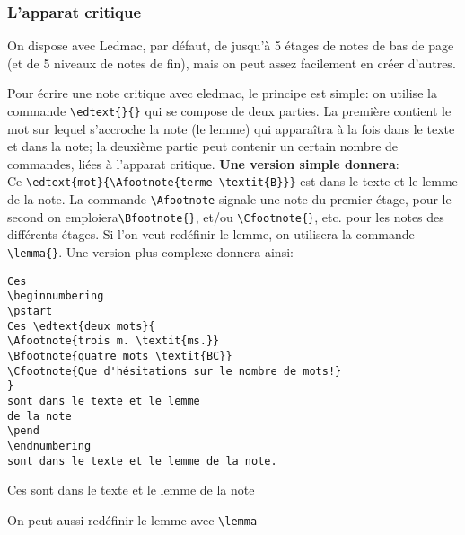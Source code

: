 \documentclass[a4paper,twoside,french,12pt]{book}
\begin{document}
 \endnumbering



\subsubsection{L'apparat critique}
On dispose avec Ledmac, par défaut, de jusqu'à 5 étages de notes de bas de page (et de 5 niveaux de notes de fin), mais on peut assez facilement en créer d'autres.

Pour écrire une note critique avec eledmac, le principe est simple: on utilise la commande \verb=\edtext{}{}= qui se compose de deux parties. La première contient le mot sur lequel s'accroche la note (le lemme) qui apparaîtra à la fois dans le texte et dans la note; la deuxième partie peut contenir un certain nombre de commandes, liées à l'apparat critique. \textbf{Une version simple donnera}:\\
Ce \verb=\edtext{mot}{\Afootnote{terme \textit{B}}}= est dans le texte et le lemme de la note.
\bigskip
La commande \verb=\Afootnote= signale une note du premier étage, pour le second on emploiera\verb=\Bfootnote{}=, et/ou \verb=\Cfootnote{}=, etc. pour les notes des différents étages. Si l'on veut redéfinir le lemme, on utilisera la commande \verb=\lemma{}=. Une version plus complexe donnera ainsi:\\
\begin{verbatim}
Ces
\beginnumbering
\pstart
Ces \edtext{deux mots}{
\Afootnote{trois m. \textit{ms.}}
\Bfootnote{quatre mots \textit{BC}}
\Cfootnote{Que d'hésitations sur le nombre de mots!}
}
sont dans le texte et le lemme
de la note
\pend
\endnumbering
sont dans le texte et le lemme de la note.
\end{verbatim}%


\beginnumbering
\pstart
Ces 
sont dans le texte et le lemme
de la note
\pend
\endnumbering

On peut aussi redéfinir le lemme avec \verb=\lemma=

\end{document}
